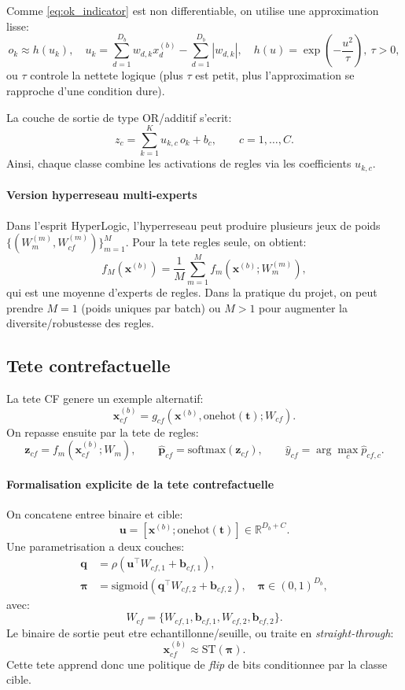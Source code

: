 \documentclass[11pt,a4paper]{article}
\begin{document}
Comme \eqref{eq:ok_indicator} est non differentiable, on utilise une approximation lisse:
\begin{equation}
o_k \approx h(u_k),
\quad
u_k=\sum_{d=1}^{D_b} w_{d,k}x^{(b)}_d-\sum_{d=1}^{D_b}|w_{d,k}|,
\quad
h(u)=\exp\!\left(-\frac{u^2}{\tau}\right),\ \tau>0,
\label{eq:ok_smooth}
\end{equation}
ou $\tau$ controle la nettete logique (plus $\tau$ est petit, plus l'approximation se rapproche
d'une condition dure).

La couche de sortie de type OR/additif s'ecrit:
\begin{equation}
z_c=\sum_{k=1}^{K} u_{k,c}\,o_k + b_c,\qquad c=1,\dots,C.
\label{eq:or_layer}
\end{equation}
Ainsi, chaque classe combine les activations de regles via les coefficients $u_{k,c}$.

\paragraph{Version hyperreseau multi-experts}
Dans l'esprit HyperLogic, l'hyperreseau peut produire plusieurs jeux de poids
$\{(W_m^{(m)},W_{cf}^{(m)})\}_{m=1}^{M}$.
Pour la tete regles seule, on obtient:
\begin{equation}
f_M(\bm{x}^{(b)})=
\frac{1}{M}\sum_{m=1}^{M} f_m(\bm{x}^{(b)};W_m^{(m)}),
\label{eq:mc_experts}
\end{equation}
qui est une moyenne d'experts de regles.
Dans la pratique du projet, on peut prendre $M=1$ (poids uniques par batch) ou $M>1$
pour augmenter la diversite/robustesse des regles.

\subsection{Tete contrefactuelle}
La tete CF genere un exemple alternatif:
\[
\bm{x}_{cf}^{(b)}=g_{cf}\!\left(\bm{x}^{(b)},\text{onehot}(\bm{t});W_{cf}\right).
\]
On repasse ensuite par la tete de regles:
\[
\bm{z}_{cf}=f_m(\bm{x}_{cf}^{(b)};W_m),\qquad
\hat{\bm{p}}_{cf}=\text{softmax}(\bm{z}_{cf}),\qquad
\hat{y}_{cf}=\arg\max_c \hat{p}_{cf,c}.
\]

\paragraph{Formalisation explicite de la tete contrefactuelle}
On concatene entree binaire et cible:
\[
\bm{u}=[\bm{x}^{(b)};\text{onehot}(\bm{t})]\in\mathbb{R}^{D_b+C}.
\]
Une parametrisation a deux couches:
\begin{align}
\bm{q} &= \rho\!\left(\bm{u}^\top W_{cf,1}+\bm{b}_{cf,1}\right),\\
\bm{\pi} &= \text{sigmoid}\!\left(\bm{q}^\top W_{cf,2}+\bm{b}_{cf,2}\right),\quad \bm{\pi}\in(0,1)^{D_b},
\end{align}
avec:
\[
W_{cf}=\{W_{cf,1},\bm{b}_{cf,1},W_{cf,2},\bm{b}_{cf,2}\}.
\]
Le binaire de sortie peut etre echantillonne/seuille, ou traite en \emph{straight-through}:
\[
\bm{x}_{cf}^{(b)} \approx \text{ST}\!\left(\bm{\pi}\right).
\]
Cette tete apprend donc une politique de \emph{flip} de bits conditionnee par la classe cible.
\end{document}
